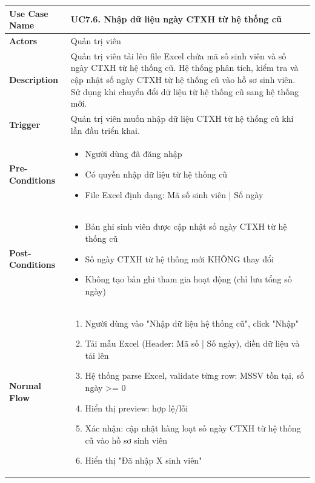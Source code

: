     \newpage
    \begin{table}[H]
    \renewcommand{\arraystretch}{1.3}
    \begin{tabular}{|m{}|m{}|}
    \hline
    \textbf{Use Case Name} 
    & \textbf{UC7.6. Nhập dữ liệu ngày CTXH từ hệ thống cũ} \\ \hline

\textbf{Actors} 
& Quản trị viên \\ \hline

\textbf{Description}
    & Quản trị viên tải lên file Excel chứa mã số sinh viên và số ngày CTXH từ hệ thống cũ. Hệ thống phân tích, kiểm tra và cập nhật số ngày CTXH từ hệ thống cũ vào hồ sơ sinh viên. Sử dụng khi chuyển đổi dữ liệu từ hệ thống cũ sang hệ thống mới.
    \\ \hline

    \textbf{Trigger} 
    & Quản trị viên muốn nhập dữ liệu CTXH từ hệ thống cũ khi lần đầu triển khai.
    \\ \hline

    \textbf{Pre-Conditions} 
    & \begin{itemize}
        \item Người dùng đã đăng nhập
        \item Có quyền nhập dữ liệu từ hệ thống cũ
        \item File Excel định dạng: Mã số sinh viên | Số ngày
    \end{itemize}
    \\ \hline

    \textbf{Post-Conditions} 
    & \begin{itemize}
        \item Bản ghi sinh viên được cập nhật số ngày CTXH từ hệ thống cũ
        \item Số ngày CTXH từ hệ thống mới KHÔNG thay đổi
        \item Không tạo bản ghi tham gia hoạt động (chỉ lưu tổng số ngày)
    \end{itemize}
    \\ \hline

    \textbf{Normal Flow} 
    & 
    \begin{enumerate}
        \item Người dùng vào "Nhập dữ liệu hệ thống cũ", click "Nhập"
        \item Tải mẫu Excel (Header: Mã số | Số ngày), điền dữ liệu và tải lên
        \item Hệ thống parse Excel, validate từng row: MSSV tồn tại, số ngày >= 0
        \item Hiển thị preview: hợp lệ/lỗi
        \item Xác nhận: cập nhật hàng loạt số ngày CTXH từ hệ thống cũ vào hồ sơ sinh viên
        \item Hiển thị "Đã nhập X sinh viên"
    \end{enumerate}
    \\ \hline


\end{tabular}
\end{table}
